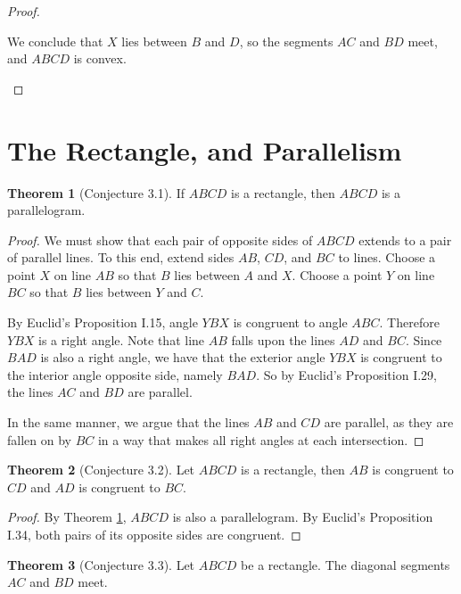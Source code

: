 \documentclass{tufte-handout}
\theoremstyle{definition}
\newtheorem{theorem}{Theorem}[section]
\begin{document}
\begin{proof}
\begin{description}
We conclude that $X$ lies between $B$ and $D$, so the segments $AC$ and $BD$ meet, and $ABCD$ is convex.
\end{description}
\end{proof}

\clearpage

\setcounter{section}{3}
\setcounter{theorem}{0}
\section{The Rectangle, and Parallelism}\label{section:rectangles}

\begin{theorem}[Conjecture 3.1]\label{theorem:rectangle-parallelogram}
If $ABCD$ is a rectangle, then $ABCD$ is a parallelogram.
\end{theorem}

\begin{proof}
We must show that each pair of opposite sides of $ABCD$ extends to a pair of parallel lines. To this end, extend sides $AB$, $CD$, and $BC$ to lines.  Choose a point $X$ on line $AB$ so that $B$ lies between $A$ and $X$. Choose a point $Y$ on line $BC$ so that $B$ lies between $Y$ and $C$.

By Euclid's Proposition I.15, angle $YBX$ is congruent to angle $ABC$. Therefore $YBX$ is a right angle. Note that line $AB$ falls upon the lines $AD$ and $BC$. Since $BAD$ is also a right angle, we have that the exterior angle $YBX$ is congruent to the interior angle opposite side, namely $BAD$. So by Euclid's Proposition I.29, the lines $AC$ and $BD$ are parallel.

In the same manner, we argue that the lines $AB$ and $CD$ are parallel, as they are fallen on by $BC$ in a way that makes all right angles at each intersection.
\end{proof}


\begin{theorem}[Conjecture 3.2]\label{theorem:rectangle-opp-sides}
Let $ABCD$ is a rectangle, then $AB$ is congruent to $CD$ and $AD$ is congruent to $BC$.
\end{theorem}

\begin{proof}
By Theorem \ref{theorem:rectangle-parallelogram}, $ABCD$ is also a parallelogram. By Euclid's Proposition I.34, both pairs of its opposite sides are congruent.
\end{proof}


\begin{theorem}[Conjecture 3.3]
Let $ABCD$ be a rectangle. The diagonal segments $AC$ and $BD$ meet.
\end{theorem}
\end{document}
